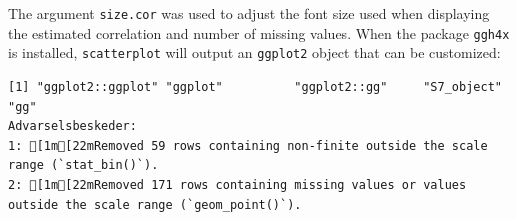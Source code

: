 \documentclass[12pt]{article}
\begin{document}
The argument \texttt{size.cor} was used to adjust the font size used when
displaying the estimated correlation and number of missing
values. When the package \texttt{ggh4x} is installed, \texttt{scatterplot} will
output an \texttt{ggplot2} object that can be customized:

\label{}
\begin{verbatim}
[1] "ggplot2::ggplot" "ggplot"          "ggplot2::gg"     "S7_object"       "gg"
Advarselsbeskeder:
1: [1m[22mRemoved 59 rows containing non-finite outside the scale range (`stat_bin()`). 
2: [1m[22mRemoved 171 rows containing missing values or values outside the scale range (`geom_point()`).
\end{verbatim}


\bigskip
\end{document}
